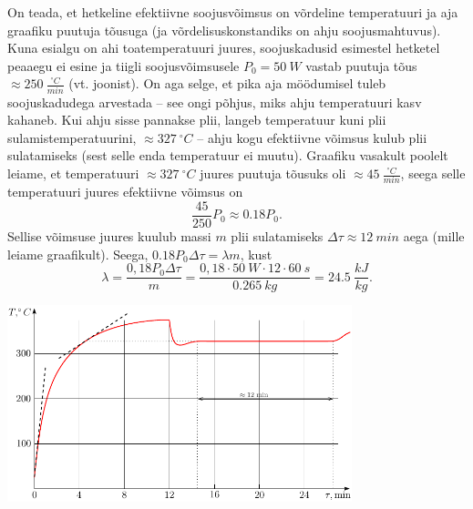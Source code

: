 {\ifSolution
On teada, et hetkeline efektiivne soojusvõimsus on võrdeline temperatuuri ja aja graafiku puutuja tõusuga (ja võrdelisuskonstandiks on ahju soojusmahtuvus). Kuna esialgu on ahi toatemperatuuri juures, soojuskadusid esimestel hetketel peaaegu ei esine ja tiigli soojusvõimsusele $P_0 = \SI{50}{W}$ vastab puutuja tõus $\approx \SI{250}{\frac{^{\circ}C} {min}}$ (vt. joonist). On aga selge, et pika aja möödumisel tuleb soojuskadudega arvestada -- see ongi põhjus, miks ahju temperatuuri kasv kahaneb. Kui ahju sisse pannakse plii, langeb temperatuur kuni plii sulamistemperatuurini, $\approx \SI{327}{^\circ C}$ -- ahju kogu efektiivne võimsus kulub plii sulatamiseks (sest selle enda temperatuur ei muutu). Graafiku vasakult poolelt leiame, et temperatuuri $\approx \SI{327}{^\circ C}$ juures puutuja tõusuks oli $\approx \SI{45}{\frac{^{\circ}C} {min}}$, seega selle temperatuuri juures efektiivne võimsus on
\[
\frac{45}{250}P_0 \approx \num{0.18}P_0.
\]
Sellise võimsuse juures kuulub massi $m$ plii sulatamiseks $\Delta\tau \approx \SI{12}{min}$ aega (mille leiame graafikult). Seega, $\num{0.18} P_0 \Delta\tau = \lambda m$, kust
\[
\lambda = \frac{0,18 P_0 \Delta \tau}{ m} = \frac{0,18 \cdot \SI{50}{W} \cdot 12 \cdot \SI{60}{s}}{\SI{0.265}{kg}} = \SI{24.5}{\frac{kJ}{kg}}.
\]
\begin{center}
\includegraphics[width = 0.75\textwidth]{2012-v3g-07-ahi_lah}
\end{center}
\fi


}
